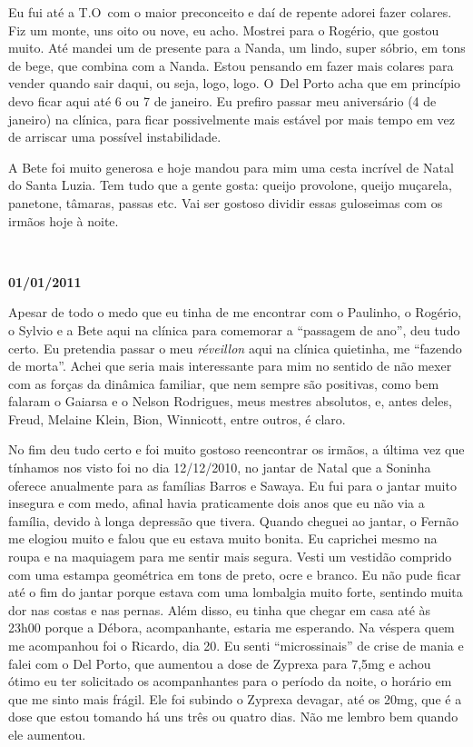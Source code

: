 Eu fui até a T.O\, com o maior preconceito e daí de repente adorei fazer
colares. Fiz um monte, uns oito ou nove, eu acho. Mostrei para o
Rogério, que gostou muito. Até mandei um de presente para a Nanda, um
lindo, super sóbrio, em tons de bege, que combina com a Nanda. Estou
pensando em fazer mais colares para vender quando sair daqui, ou seja,
logo, logo. O~Del Porto acha que em princípio devo ficar aqui até 6 ou 7
de janeiro. Eu prefiro passar meu aniversário (4 de janeiro) na clínica,
para ficar possivelmente mais estável por mais tempo em vez de arriscar
uma possível instabilidade.

A Bete foi muito generosa e hoje mandou para mim uma cesta incrível de
Natal do Santa Luzia. Tem tudo que a gente gosta: queijo provolone,
queijo muçarela, panetone, tâmaras, passas etc. Vai ser gostoso dividir
essas guloseimas com os irmãos hoje à noite.

\begin{center}\asterisc{}​\end{center}


\begin{flushright}\textbf{01/01/2011}\end{flushright}


Apesar de todo o medo que eu tinha de me encontrar com o Paulinho, o
Rogério, o Sylvio e a Bete aqui na clínica para comemorar a ``passagem
de ano'', deu tudo certo. Eu pretendia passar o meu \emph{réveillon}
aqui na clínica quietinha, me ``fazendo de morta''. Achei que seria mais
interessante para mim no sentido de não mexer com as forças da dinâmica
familiar, que nem sempre são positivas, como bem falaram o Gaiarsa e o
Nelson Rodrigues, meus mestres absolutos, e, antes deles, Freud, Melaine
Klein, Bion, Winnicott, entre outros, é claro.

No fim deu tudo certo e foi muito gostoso reencontrar os irmãos, a
última vez que tínhamos nos visto foi no dia 12/12/2010, no jantar de
Natal que a Soninha oferece anualmente para as famílias Barros e Sawaya.
Eu fui para o jantar muito insegura e com medo, afinal havia
praticamente dois anos que eu não via a família, devido à longa
depressão que tivera. Quando cheguei ao jantar, o Fernão me elogiou
muito e falou que eu estava muito bonita. Eu caprichei mesmo na roupa e
na maquiagem para me sentir mais segura. Vesti um vestidão comprido com
uma estampa geométrica em tons de preto, ocre e branco. Eu não pude
ficar até o fim do jantar porque estava com uma lombalgia muito forte,
sentindo muita dor nas costas e nas pernas. Além disso, eu tinha que
chegar em casa até às 23h00 porque a Débora, acompanhante, estaria me
esperando. Na véspera quem me acompanhou foi o Ricardo, dia 20. Eu senti
``microssinais'' de crise de mania e falei com o Del Porto, que aumentou
a dose de Zyprexa para 7,5mg e achou ótimo eu ter solicitado os
acompanhantes para o período da noite, o horário em que me sinto mais
frágil. Ele foi subindo o Zyprexa devagar, até os 20mg, que é a dose que
estou tomando há uns três ou quatro dias. Não me lembro bem quando ele
aumentou.

